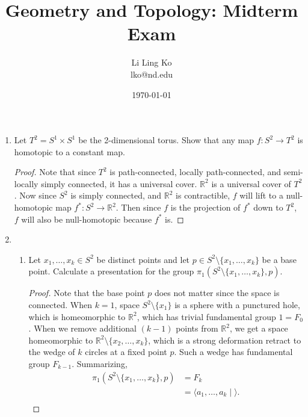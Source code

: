 \documentclass{article}
\begin{document}
\title{Geometry and Topology: Midterm Exam}
\author{Li Ling Ko\\ lko@nd.edu}
\date{\today}
\maketitle

\begin{enumerate}[label={\bf Q\arabic*:}]
  \item Let $T^2=S^1\times S^1$ be the 2-dimensional torus. Show that any
    map $f:S^2\rightarrow T^2$ is homotopic to a constant map.
    \begin{proof}
      Note that since $T^2$ is path-connected, locally path-connected, and
      semi-locally simply connected, it has a universal cover.
      $\mathbb{R}^2$ is a universal cover of $T^2$. Now since $S^2$ is
      simply connected, and $\mathbb{R}^2$ is contractible, $f$ will lift
      to a null-homotopic map $f^*:S^2\rightarrow\mathbb{R}^2$. Then since
      $f$ is the projection of $f^*$ down to $T^2$, $f$ will also be
      null-homotopic because $f^*$ is.
    \end{proof}

  \item
    \begin{enumerate}
      \item Let $x_1,\ldots,x_k\in S^2$ be distinct points and let $p\in
        S^2\setminus\{x_1,\ldots,x_k\}$ be a base point. Calculate a
        presentation for the group
        $\pi_1(S^2\setminus\{x_1,\ldots,x_k\},p)$.

        \begin{proof}
          Note that the base point $p$ does not matter since the space is
          connected. When $k=1$, space $S^2\setminus\{x_1\}$ is a sphere
          with a punctured hole, which is homeomorphic to $\mathbb{R}^2$,
          which has trivial fundamental group $1=F_0$. When we remove
          additional $(k-1)$ points from $\mathbb{R}^2$, we get a space
          homeomorphic to $\mathbb{R}^2\setminus\{x_2,\ldots,x_k\}$, which
          is a strong deformation retract to the wedge of $k$ circles at a
          fixed point $p$. Such a wedge has fundamental group $F_{k-1}$.
          Summarizing,
          \begin{align*}
            \pi_1(S^2\setminus\{x_1,\ldots,x_k\},p) &=F_k \\
              &=\langle a_1,\ldots,a_k\; |\; \rangle. \\
          \end{align*}
        \end{proof}


\end{enumerate}
\end{enumerate}
\end{document}
